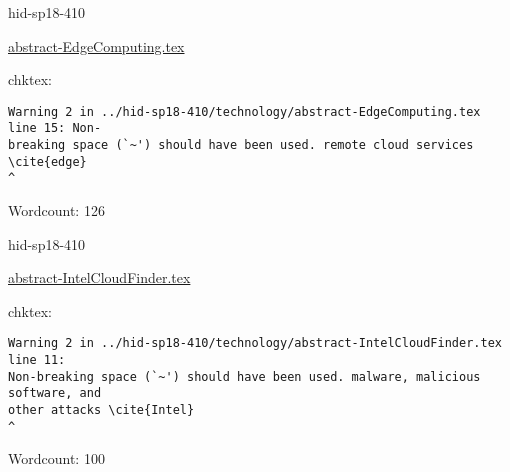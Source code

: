 

\begin{IU}

hid-sp18-410

\href{https://github.com/cloudmesh-community/hid-sp18-410/blob/master//technology/abstract-EdgeComputing.tex}{abstract-EdgeComputing.tex}

 
chktex:
\begin{tiny}
\begin{verbatim}
Warning 2 in ../hid-sp18-410/technology/abstract-EdgeComputing.tex line 15: Non-
breaking space (`~') should have been used. remote cloud services \cite{edge}
^
\end{verbatim}
\end{tiny}

Wordcount: 126

\end{IU}



\begin{IU}

hid-sp18-410

\href{https://github.com/cloudmesh-community/hid-sp18-410/blob/master//technology/abstract-IntelCloudFinder.tex}{abstract-IntelCloudFinder.tex}

 
chktex:
\begin{tiny}
\begin{verbatim}
Warning 2 in ../hid-sp18-410/technology/abstract-IntelCloudFinder.tex line 11:
Non-breaking space (`~') should have been used. malware, malicious software, and
other attacks \cite{Intel}                                                 ^
\end{verbatim}
\end{tiny}

Wordcount: 100

\end{IU}



